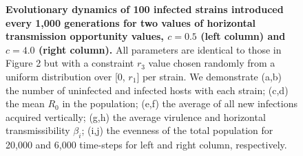 \begin{figure}[tbp]
    \medskip
    \hfil
        
    \medskip
    \hfil
\caption{\textbf{Evolutionary dynamics of 100 infected strains introduced every 1,000 generations for two values of horizontal transmission opportunity values, $c = 0.5$ (left column) and $c = 4.0$ (right column).} All parameters are identical to those in Figure 2 but with a constraint $r_3$ value chosen randomly from a uniform distribution over [0, $r_1$] per strain. We demonstrate (a,b) the number of uninfected and infected hosts with each strain; (c,d) the mean $R_0$ in the population; (e,f) the average of all new infections acquired vertically; (g,h) the average virulence and horizontal transmissibility $\beta_i$; (i,j) the evenness of the total population for 20,000 and 6,000 time-steps for left and right column, respectively.
}
    \label{fig:SF3}
\end{figure}
